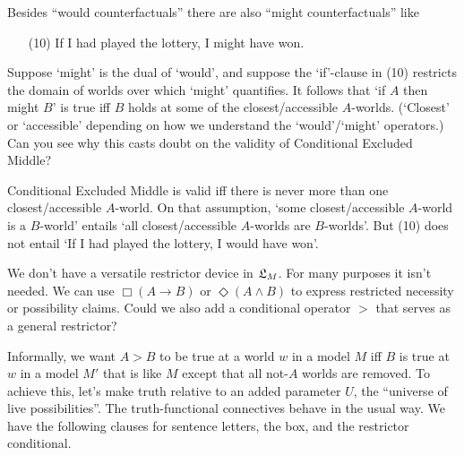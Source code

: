 \begin{exercise}
  Besides ``would counterfactuals'' there are also ``might counterfactuals'' like
  \begin{enumerate}[leftmargin=10mm]
    \item[(10)] If I had played the lottery, I might have won.
  \end{enumerate}
  Suppose `might' is the dual of `would', and suppose the `if'-clause in (10)
  restricts the domain of worlds over which `might' quantifies. It follows that
  `if $A$ then might $B$' is true iff $B$ holds at some of the
  closest/accessible $A$-worlds. (`Closest' or `accessible' depending on how we
  understand the `would'/`might' operators.) Can you see why this casts doubt on
  the validity of Conditional Excluded Middle?
\end{exercise}
\begin{solution}
  Conditional Excluded Middle is valid iff there is never more than one
  closest/accessible $A$-world. On that assumption, `some closest/accessible
  $A$-world is a $B$-world' entails `all closest/accessible $A$-worlds are
  $B$-worlds'. But (10) does not entail `If I had played the lottery, I would
  have won'.
\end{solution}


\iffalse

We don't have a versatile restrictor device in $\mathfrak{L}_{M}$. For many purposes it
isn't needed. We can use $\Box(A \to B)$ or $\Diamond(A \land B)$ to express
restricted necessity or possibility claims. Could we also add a conditional
operator $>$ that serves as a general restrictor?

Informally, we want $A > B$ to be true at a world $w$ in a model $M$ iff $B$ is
true at $w$ in a model $M'$ that is like $M$ except that all not-$A$ worlds are
removed. To achieve this, let's make truth relative to an added parameter $U$,
the ``universe of live possibilities''. The truth-functional connectives behave
in the usual way. We have the following clauses for sentence letters, the box,
and the restrictor conditional.

